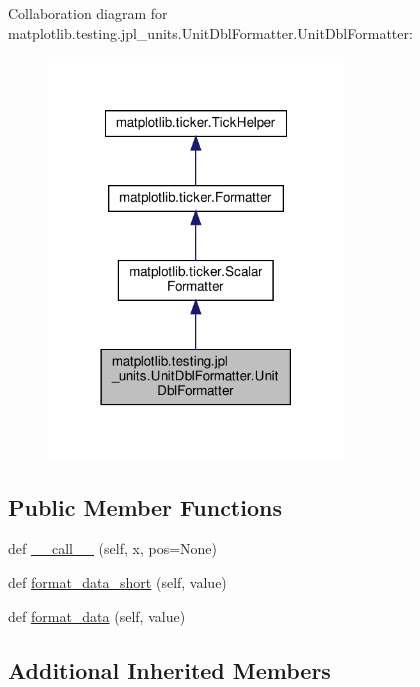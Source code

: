Collaboration diagram for matplotlib.\+testing.\+jpl\+\_\+units.\+Unit\+Dbl\+Formatter.\+Unit\+Dbl\+Formatter\+:
\nopagebreak
\begin{figure}[H]
\begin{center}
\leavevmode
\includegraphics[width=222pt]{classmatplotlib_1_1testing_1_1jpl__units_1_1UnitDblFormatter_1_1UnitDblFormatter__coll__graph}
\end{center}
\end{figure}
\subsection*{Public Member Functions}
\begin{DoxyCompactItemize}
\item 
def \hyperlink{classmatplotlib_1_1testing_1_1jpl__units_1_1UnitDblFormatter_1_1UnitDblFormatter_a6231420bc1501c59f1f57f3564627bef}{\+\_\+\+\_\+call\+\_\+\+\_\+} (self, x, pos=None)
\item 
def \hyperlink{classmatplotlib_1_1testing_1_1jpl__units_1_1UnitDblFormatter_1_1UnitDblFormatter_a3b492e18103350ab21213bd49abe8800}{format\+\_\+data\+\_\+short} (self, value)
\item 
def \hyperlink{classmatplotlib_1_1testing_1_1jpl__units_1_1UnitDblFormatter_1_1UnitDblFormatter_af42820845dead655510f2a3d7486b4f9}{format\+\_\+data} (self, value)
\end{DoxyCompactItemize}
\subsection*{Additional Inherited Members}


